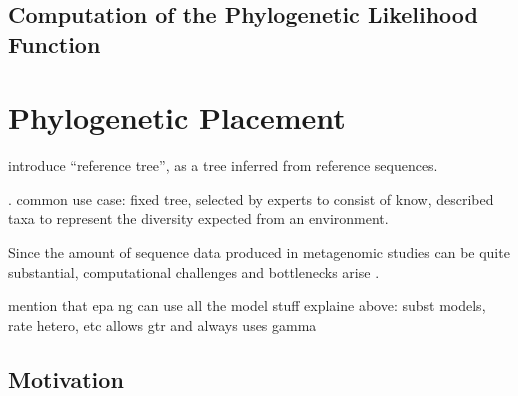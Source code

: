 

\subsection{Computation of the Phylogenetic Likelihood Function}
\label{ch:Foundations:sec:MLTreeInference:sub:Computation}



\section{Phylogenetic Placement}
\label{ch:Foundations:sec:PhylogeneticPlacement}

introduce ``reference tree'', as a tree inferred from reference sequences.

. common use case: fixed tree, selected by experts to consist of know, described taxa
to represent the diversity expected from an environment.


Since the amount of sequence data produced in metagenomic studies can be quite substantial,
computational challenges and bottlenecks arise \cite{Scholz2012}.


mention that epa ng can use all the model stuff explaine above: subst models, rate hetero, etc
allows gtr and always uses gamma


\subsection{Motivation}
\label{ch:Foundations:sec:PhylogeneticPlacement:sub:Motivation}


